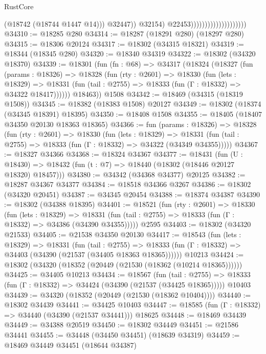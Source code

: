 \begin{lexlean}{RustCore}
\begin{coremodule}
                                                    (@18742 (@18744 @1447 @14)))
                                                  @32447))
                                              @32154)
                                            @22453))))))))))))))))))))
@34310 := @18285 @280
@34314 := @18287 (@18291 @280) (@18297 @280)
@34315 := @18306 @20124
@34317 := @18302 (@34315 @18321)
@34319 := @18344 (@18345 @280)
@34320 := @18340 @34319
@34322 := @18302 (@34320 @18370)
@34339 := @18301
    (fun (fn : @68) =>
    @34317
      (@18324
        (@18327
          (fun (params : @18326) =>
          @18328
            (fun (rty : @2601) =>
            @18330
              (fun (lets : @18329) =>
              @18331 (fun (tail : @2755) => @18333 (fun (Γ : @18332) => @34322 @18417))))))
        @18463))
    @1508
@34342 := @18469 (@34315 (@18319 @1508))
@34345 := @18382 (@18383 @1508) @20127
@34349 := @18302 (@18374 (@34345 @18391) @18395)
@34350 := @18408 @1508
@34355 := @18405 (@18407 @34350 @20130 @18363 @18365)
@34366 := fun (params : @18326) =>
  @18328
    (fun (rty : @2601) =>
    @18330
      (fun (lets : @18329) =>
      @18331 (fun (tail : @2755) => @18333 (fun (Γ : @18332) => @34322 (@34349 @34355)))))
@34367 := @18327 @34366
@34368 := @18324 @34367
@34377 := @18431
    (fun (U : @18430) => @18432 (fun (t : @7) => @18440 (@18302 (@18446 @20127 @18320) @18457)))
@34380 := @34342 (@34368 @34377) @20125
@34382 := @18287 @34367 @34377
@34384 := @18518 @34366 @3267
@34386 := @18302 (@34320 @20451)
@34387 := @34345 @20454
@34388 := @18374 @34387
@34390 := @18302 (@34388 @18395)
@34401 := @18521
    (fun (rty : @2601) =>
    @18330
      (fun (lets : @18329) =>
      @18331 (fun (tail : @2755) => @18333 (fun (Γ : @18332) => @34386 (@34390 @34355)))))
    @2595
@34403 := @18302 (@34320 @21533)
@34405 := @21538 @34350 @20130
@34417 := @18543
    (fun (lets : @18329) =>
    @18331
      (fun (tail : @2755) =>
      @18333 (fun (Γ : @18332) => @34403 (@34390 (@21537 (@34405 @18363 @18365))))))
    @10213
@34424 := @18302 (@34320 (@18352 (@20449 (@21530 (@18362 (@10214 @18365))))))
@34425 := @34405 @10213
@34434 := @18567
    (fun (tail : @2755) => @18333 (fun (Γ : @18332) => @34424 (@34390 (@21537 (@34425 @18365)))))
    @10403
@34439 := @34320 (@18352 (@20449 (@21530 (@18362 @10404))))
@34440 := @18302 @34439
@34441 := @34425 @10403
@34447 := @18585 (fun (Γ : @18332) => @34440 (@34390 (@21537 @34441))) @18625
@34448 := @18469 @34439
@34449 := @34388 @20519
@34450 := @18302 @34449
@34451 := @21586 @34441
@34455 := @34448 (@34450 @34451) (@18639 @34319)
@34459 := @18469 @34449 @34451 (@18644 @34387)

\end{coremodule}
\end{lexlean}
